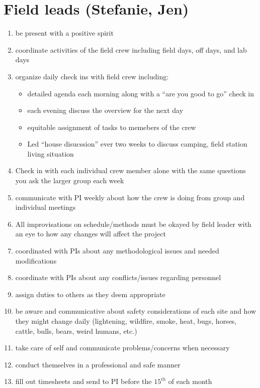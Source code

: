 \documentclass[12pt]{article}
\begin{document}
\section{Field leads (Stefanie, Jen)}
\begin{enumerate}
\item be present with a positive spirit
\item coordinate activities of the field crew including field days,
  off days, and lab days
\item organize daily check ins with field crew including:
  \begin{itemize}
  \item detailed agenda each morning along with a ``are you good to
    go'' check in
  \item each evening discuss the overview for the next day
  \item equitable assignment of tasks to memebers of the crew
  \item Led ``house disucssion'' ever two weeks to discuss camping,
    field station living situation
  \end{itemize}
\item Check in with each individual crew member alone with the same
  questions you ask the larger group each week
\item communicate with PI weekly about how the crew is doing from group
  and individual meetings
\item All improvisations on schedule/methods must be okayed by field
  leader with an eye to how any changes will affect the project
\item coordinated with PIs about any methodological issues and needed
  modifications
\item coordinate with PIs about any conflicts/issues regarding personnel
\item assign duties to others as they deem appropriate
\item be aware and communicative about safety considerations of each
  site and how they might change daily (lightening, wildfire, smoke,
  heat, bugs, horses, cattle, bulls, bears, weird humans, etc.)
\item take care of self and communicate problems/concerns when
  necessary
\item conduct themselves in a professional and safe manner
\item fill out timesheets and send to PI before the $15^{th}$ of each month
\end{enumerate}
\end{document}
